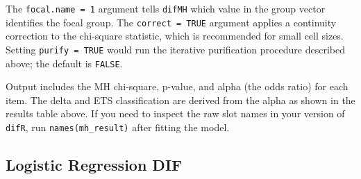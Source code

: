 \documentclass[
  11pt,
  letterpaper,
]{scrbook}
\newenvironment{Shaded}{\begin{snugshade}}{\end{snugshade}}
\newcommand{\AttributeTok}[1]{\textcolor[rgb]{0.40,0.45,0.13}{#1}}
\newcommand{\CommentTok}[1]{\textcolor[rgb]{0.37,0.37,0.37}{#1}}
\newcommand{\ConstantTok}[1]{\textcolor[rgb]{0.56,0.35,0.01}{#1}}
\newcommand{\DecValTok}[1]{\textcolor[rgb]{0.68,0.00,0.00}{#1}}
\newcommand{\FloatTok}[1]{\textcolor[rgb]{0.68,0.00,0.00}{#1}}
\newcommand{\FunctionTok}[1]{\textcolor[rgb]{0.28,0.35,0.67}{#1}}
\newcommand{\NormalTok}[1]{\textcolor[rgb]{0.00,0.23,0.31}{#1}}
\newcommand{\OtherTok}[1]{\textcolor[rgb]{0.00,0.23,0.31}{#1}}
\newcommand{\SpecialCharTok}[1]{\textcolor[rgb]{0.37,0.37,0.37}{#1}}
\newcommand{\StringTok}[1]{\textcolor[rgb]{0.13,0.47,0.30}{#1}}
\begin{document}
\begin{Shaded}
\end{Shaded}

The \texttt{focal.name\ =\ 1} argument tells \texttt{difMH} which value
in the group vector identifies the focal group. The
\texttt{correct\ =\ TRUE} argument applies a continuity correction to
the chi-square statistic, which is recommended for small cell sizes.
Setting \texttt{purify\ =\ TRUE} would run the iterative purification
procedure described above; the default is \texttt{FALSE}.

Output includes the MH chi-square, p-value, and alpha (the odds ratio)
for each item. The delta and ETS classification are derived from the
alpha as shown in the results table above. If you need to inspect the
raw slot names in your version of \texttt{difR}, run
\texttt{names(mh\_result)} after fitting the model.

\subsection{Logistic Regression DIF}\label{logistic-regression-dif}
\end{document}

